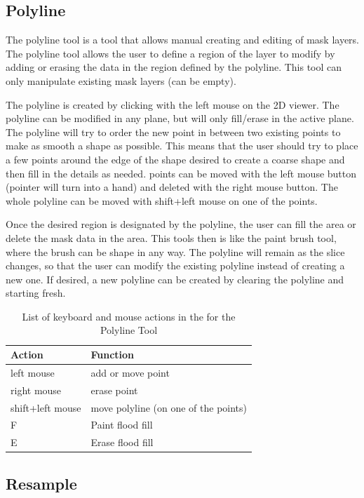 \documentclass[fleqn,11pt,openany]{book}
\begin{document}
\subsection{Polyline}

The polyline tool is a tool that allows manual creating and editing of mask layers.  The polyline tool allows the user to define a region of the layer to modify by adding or erasing the data in the region defined by the polyline.  This tool can only manipulate existing mask layers (can be empty).  

The polyline is created by clicking with the left mouse on the 2D viewer.  The polyline can be modified in any plane, but will only fill/erase in the active plane.   The polyline will try to order the new point in between two existing points to make as smooth a shape as possible.  This means that the user should try to place a few points around the edge of the shape desired to create a coarse shape and then fill in the details as needed.  points can be moved with the left mouse button (pointer will turn into a hand) and deleted with the right mouse button.  The whole polyline can be moved with shift+left mouse on one of the points.  

Once the desired region is designated by the polyline, the user can fill the area or delete the mask data in the area.  This tools then is like the paint brush tool, where the brush can be shape in any way.  The polyline will remain as the slice changes, so that the user can modify the existing polyline instead of creating a new one.  If desired, a new polyline can be created by clearing the polyline and starting fresh.  


\begin{table}[h!]
\label{tab:polylinekey}
\caption{List of keyboard and mouse actions in the for the Polyline Tool}
\begin{tabular}{|l|l|}
\hline
{\bf Action} & {\bf Function}\\
\hline 
left mouse & add or move point \\
\hline
right mouse & erase point\\
\hline
shift+left mouse & move polyline (on one of the points)\\
\hline
F & Paint flood fill\\
\hline
E & Erase flood fill\\ 
\hline
\end{tabular}
\end{table}

\subsection{Resample}
\end{document}
